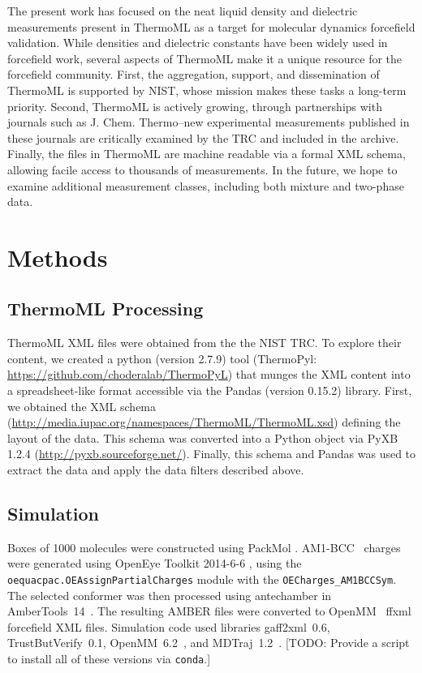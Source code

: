\documentclass[aps,pre,twocolumn,nofootinbib,superscriptaddress,linenumbers]{revtex4-1}
\begin{document}
The present work has focused on the neat liquid density and dielectric measurements present in ThermoML \cite{frenkel2006xml, frenkel2003thermoml, chirico2003thermoml} as a target for molecular dynamics forcefield validation.  
While densities and dielectric constants have been widely used in forcefield work, several aspects of ThermoML make it a unique resource for the forcefield community.  
First, the aggregation, support, and dissemination of ThermoML is supported by NIST, whose mission makes these tasks a long-term priority.  
Second, ThermoML is actively growing, through partnerships with journals such as J. Chem. Thermo--new experimental measurements published in these journals are critically examined by the TRC and included in the archive.  
Finally, the files in ThermoML are machine readable via a formal XML schema, allowing facile access to thousands of measurements.  
In the future, we hope to examine additional measurement classes, including both mixture and two-phase data.


\section{Methods}

\subsection{ThermoML Processing}

ThermoML XML files were obtained from the the NIST TRC.  To explore their content, we created a python (version 2.7.9) tool (ThermoPyl: \url{https://github.com/choderalab/ThermoPyL}) that munges the XML content into a spreadsheet-like format accessible via the  Pandas (version 0.15.2) library.  
First, we obtained the XML schema (\url{http://media.iupac.org/namespaces/ThermoML/ThermoML.xsd}) defining the layout of the data.  
This schema was converted into a Python object via PyXB 1.2.4 (\url{http://pyxb.sourceforge.net/}).  
Finally, this schema and Pandas was used to extract the data and apply the data filters described above.  

\subsection{Simulation}
Boxes of 1000 molecules were constructed using PackMol \cite{martinez2009packmol}. 
AM1-BCC~\cite{am1bcc1,am1bcc2} charges were generated using OpenEye Toolkit 2014-6-6 \cite{openeye}, using the {\tt oequacpac.OEAssignPartialCharges} module with the {\tt OECharges\_AM1BCCSym}.  
The selected conformer was then processed using antechamber in AmberTools~14~\cite{amber14}.  
The resulting AMBER files were converted to OpenMM~\cite{eastman2012openmm} ffxml forcefield XML files.  
Simulation code used libraries gaff2xml~0.6, TrustButVerify~0.1, OpenMM~6.2~\cite{eastman2012openmm}, and MDTraj~1.2~\cite{mcgibbon2014mdtraj}.  
{\color{red}[TODO: Provide a script to install all of these versions via {\tt conda}.]}
\end{document}
